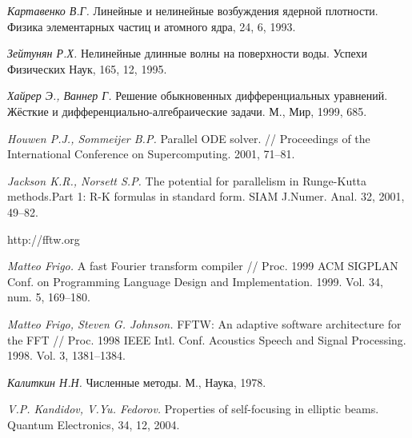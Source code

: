 \documentclass[12pt,a4paper,twoside]{article}
\begin{document}
\begin{thebibliography}{99}
        \textit{Картавенко В.Г.}
        Линейные и нелинейные возбуждения ядерной плотности.
        Физика элементарных частиц и атомного ядра, 24, 6, 1993.

        \textit{Зейтунян Р.Х.}
        Нелинейные длинные волны на поверхности воды.
        Успехи Физических Наук, 165, 12, 1995.

        \textit{Хайрер Э., Ваннер Г.}
        Решение обыкновенных дифференциальных уравнений. Жёсткие и дифференциально-алгебраические задачи.
        М., Мир, 1999, 685.

        \textit{Houwen P.J., Sommeijer B.P.} Parallel ODE solver.
        // Proceedings of the International Conference on Supercomputing.
        2001, 71--81.

        \textit{Jackson K.R., Norsett S.P.}
        The potential for parallelism in Runge-Kutta methods.Part 1: R-K formulas in standard form.
        SIAM J.Numer. Anal. 32, 2001, 49--82.

        http://fftw.org

        \textit{Matteo Frigo.} A fast Fourier transform compiler
        // Proc. 1999 ACM SIGPLAN Conf. on Programming Language Design and Implementation.
        1999. Vol. 34, num. 5, 169--180.

        \textit{Matteo Frigo, Steven G. Johnson.} FFTW: An adaptive software architecture for the FFT
        // Proc. 1998 IEEE Intl. Conf. Acoustics Speech and Signal Processing.
        1998. Vol. 3, 1381--1384.

        \textit{Калиткин Н.Н.}
        Численные методы.
        М., Наука, 1978.

        \textit{V.P. Kandidov, V.Yu. Fedorov.}
        Properties of self-focusing in elliptic beams.
        Quantum Electronics, 34, 12, 2004.
    \end{thebibliography}
\end{document}
